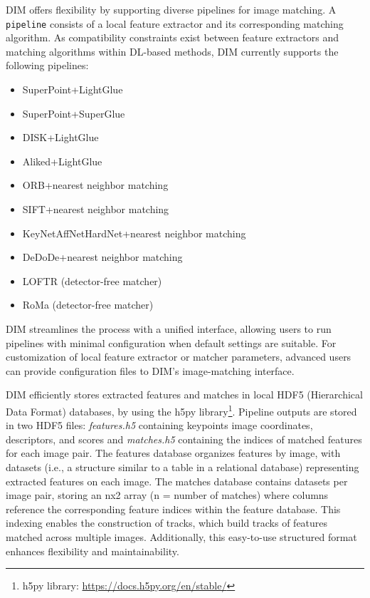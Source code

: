 DIM offers flexibility by supporting diverse pipelines for image matching. 
A \texttt{pipeline} consists of a local feature extractor and its corresponding matching algorithm. 
As compatibility constraints exist between feature extractors and matching algorithms within DL-based methods, DIM currently supports the following pipelines:
\begin{itemize}
    \item SuperPoint+LightGlue
    \item SuperPoint+SuperGlue
    \item DISK+LightGlue
    \item Aliked+LightGlue
    \item ORB+nearest neighbor matching
    \item SIFT+nearest neighbor matching
    \item KeyNetAffNetHardNet+nearest neighbor matching
    \item DeDoDe+nearest neighbor matching
    \item LOFTR (detector-free matcher)
    \item RoMa (detector-free matcher)
\end{itemize}

DIM streamlines the process with a unified interface, allowing users to run pipelines with minimal configuration when default settings are suitable. 
For customization of local feature extractor or matcher parameters, advanced users can provide configuration files to DIM's image-matching interface.

DIM efficiently stores extracted features and matches in local HDF5 (Hierarchical Data Format) databases, by using the h5py library\footnote{h5py library: \url{https://docs.h5py.org/en/stable/}}. 
Pipeline outputs are stored in two HDF5 files: \textit{features.h5} containing keypoints image coordinates, descriptors, and scores and \textit{matches.h5} containing the indices of matched features for each image pair. 
The features database organizes features by image, with datasets (i.e., a structure similar to a table in a relational database) representing extracted features on each image. 
The matches database contains datasets per image pair, storing an nx2 array (n = number of matches) where columns reference the corresponding feature indices within the feature database. 
This indexing enables the construction of tracks, which build tracks of features matched across multiple images. 
Additionally, this easy-to-use structured format enhances flexibility and maintainability.

